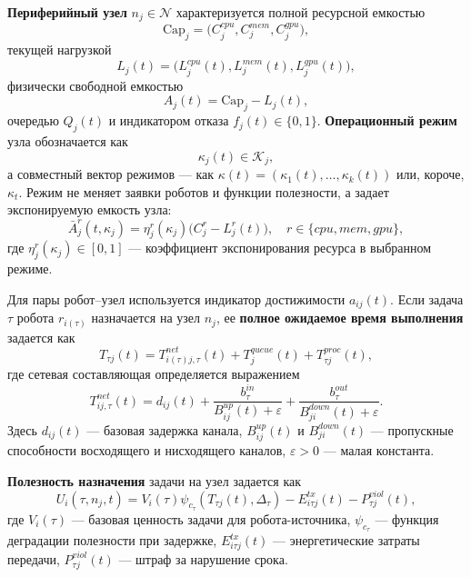 \documentclass[a4paper,14pt]{extarticle}
\begin{document}
\textbf{Периферийный узел} $n_j\in\mathcal{N}$ характеризуется полной ресурсной емкостью
\begin{equation}
	\mathrm{Cap}_j=\bigl(C^{cpu}_j,C^{mem}_j,C^{gpu}_j\bigr),
	\label{eq:nir_capacity}
\end{equation}
текущей нагрузкой
\begin{equation}
	L_j(t)=\bigl(L^{cpu}_j(t),L^{mem}_j(t),L^{gpu}_j(t)\bigr),
	\label{eq:nir_load}
\end{equation}
физически свободной емкостью
\begin{equation}
	A_j(t)=\mathrm{Cap}_j-L_j(t),
	\label{eq:nir_available}
\end{equation}
очередью $Q_j(t)$ и индикатором отказа $f_j(t)\in\{0,1\}$. \textbf{Операционный режим} узла обозначается как
\begin{equation}
	\kappa_j(t)\in\mathcal{K}_j,
	\label{eq:nir_mode}
\end{equation}
а совместный вектор режимов --- как $\kappa(t)=(\kappa_1(t),\ldots,\kappa_k(t))$ или, короче, $\kappa_t$. Режим не меняет заявки роботов и функции полезности, а задает экспонируемую емкость узла:
\begin{equation}
	\bar{A}^{r}_j(t,\kappa_j)=\eta^{r}_j(\kappa_j)\bigl(C^{r}_j-L^{r}_j(t)\bigr),
	\quad r\in\{cpu,mem,gpu\},
	\label{eq:nir_exposed_capacity}
\end{equation}
где $\eta^r_j(\kappa_j)\in[0,1]$ --- коэффициент экспонирования ресурса в выбранном режиме.

Для пары робот--узел используется индикатор достижимости $a_{ij}(t)$. Если задача $\tau$ робота $r_{i(\tau)}$ назначается на узел $n_j$, ее \textbf{полное ожидаемое время выполнения} задается как
\begin{equation}
	T_{\tau j}(t)=T^{net}_{i(\tau)j,\tau}(t)+T^{queue}_{j}(t)+T^{proc}_{\tau j}(t),
	\label{eq:nir_task_time}
\end{equation}
где сетевая составляющая определяется выражением
\begin{equation}
	T^{net}_{ij,\tau}(t)=d_{ij}(t)+\frac{b^{in}_{\tau}}{B^{up}_{ij}(t)+\varepsilon}+\frac{b^{out}_{\tau}}{B^{down}_{ji}(t)+\varepsilon}.
	\label{eq:nir_network_time}
\end{equation}
Здесь $d_{ij}(t)$ --- базовая задержка канала, $B^{up}_{ij}(t)$ и $B^{down}_{ji}(t)$ --- пропускные способности восходящего и нисходящего каналов, $\varepsilon>0$ --- малая константа.

\textbf{Полезность назначения} задачи на узел задается как
\begin{equation}
	U_i(\tau,n_j,t)=V_i(\tau)\psi_{c_{\tau}}(T_{\tau j}(t),\Delta_{\tau})-E^{tx}_{i\tau j}(t)-P^{viol}_{\tau j}(t),
	\label{eq:nir_utility}
\end{equation}
где $V_i(\tau)$ --- базовая ценность задачи для робота-источника, $\psi_{c_\tau}$ --- функция деградации полезности при задержке, $E^{tx}_{i\tau j}(t)$ --- энергетические затраты передачи, $P^{viol}_{\tau j}(t)$ --- штраф за нарушение срока. 
\end{document}
